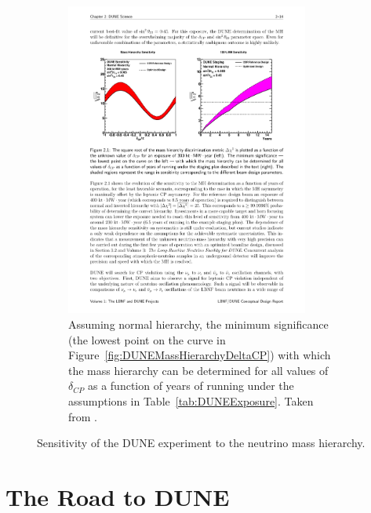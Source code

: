 \begin{figure}
\begin{subfigure}[t]{\linewidth}
    \includegraphics[width=8cm]{DUNEMassHierarchyTime.pdf}
    \caption{Assuming normal hierarchy, the minimum significance (the lowest point on the curve in Figure~\ref{fig:DUNEMassHierarchyDeltaCP}) with which the mass hierarchy can be determined for all values of $\delta_{CP}$ as a function of years of running under the assumptions in Table~\ref{tab:DUNEExposure}.  Taken from \cite{DUNECDR1}.}
    \label{fig:DUNEMassHierarchyTime}
  \end{subfigure}
  \caption[Sensitivity of the DUNE experiment to the neutrino mass hierarchy.]{Sensitivity of the DUNE experiment to the neutrino mass hierarchy.}
  \label{fig:DUNEMassHierarchy}
\end{figure}

\section{The Road to DUNE}\label{sec:RoadToDUNE}
